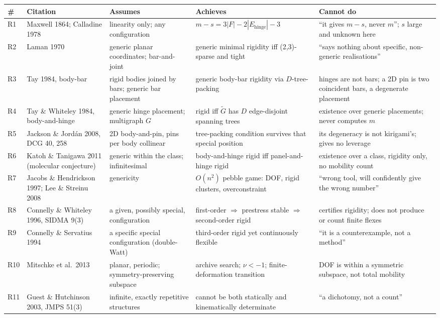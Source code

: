 \documentclass[10pt,a4paper]{article}
\begin{document}
\begin{longtable}{@{}p{6mm}p{34mm}p{40mm}p{38mm}p{42mm}@{}}
\toprule
\# & Citation & Assumes & Achieves & Cannot do \\
\midrule
\endhead
R1 & Maxwell 1864; Calladine 1978 & linearity only; any configuration & $m-s = 3|F| - 2|E_{\mathrm{hinge}}| - 3$ & ``it gives $m-s$, never $m$''; $s$ large and unknown here \\
R2 & Laman 1970 & generic planar coordinates; bar-and-joint & generic minimal rigidity iff (2,3)-sparse and tight & ``says nothing about specific, non-generic realisations'' \\
R3 & Tay 1984, body-bar & rigid bodies joined by bars; generic bar placement & generic body-bar rigidity via $D$-tree-packing & hinges are not bars; a 2D pin is two coincident bars, a degenerate placement \\
R4 & Tay \& Whiteley 1984, body-and-hinge & generic hinge placement; multigraph $G$ & rigid iff $\tilde G$ has $D$ edge-disjoint spanning trees & existence over generic placements; never computes $m$ \\
R5 & Jackson \& Jord\'an 2008, DCG 40, 258 & 2D body-and-pin, pins per body collinear & tree-packing condition survives that special position & its degeneracy is not kirigami's; gives no leverage \\
R6 & Katoh \& Tanigawa 2011 (molecular conjecture) & generic within the class; infinitesimal & body-and-hinge rigid iff panel-and-hinge rigid & existence over a class, rigidity only, no mobility count \\
R7 & Jacobs \& Hendrickson 1997; Lee \& Streinu 2008 & genericity & $O(n^2)$ pebble game: DOF, rigid clusters, overconstraint & ``wrong tool, will confidently give the wrong number'' \\
R8 & Connelly \& Whiteley 1996, SIDMA 9(3) & a given, possibly special, configuration & first-order $\Rightarrow$ prestress stable $\Rightarrow$ second-order rigid & certifies rigidity; does not produce or count finite flexes \\
R9 & Connelly \& Servatius 1994 & a specific special configuration (double-Watt) & third-order rigid yet continuously flexible & ``it is a counterexample, not a method'' \\
R10 & Mitschke et al.\ 2013 & planar, periodic; symmetry-preserving subspace & archive search; $\nu<-1$; finite-deformation transition & DOF is within a symmetric subspace, not total mobility \\
R11 & Guest \& Hutchinson 2003, JMPS 51(3) & infinite, exactly repetitive structures & cannot be both statically and kinematically determinate & ``a dichotomy, not a count'' \\

\end{longtable}
\end{document}
